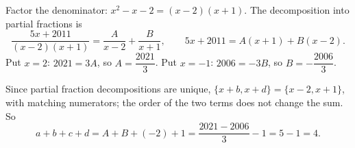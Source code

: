 Factor the denominator: $x^2-x-2=(x-2)(x+1)$. The decomposition into partial fractions is
\[
\dfrac{5x+2011}{(x-2)(x+1)}=\dfrac{A}{x-2}+\dfrac{B}{x+1},\qquad 5x+2011=A(x+1)+B(x-2).
\]
Put $x=2$: $2021=3A$, so $A=\dfrac{2021}{3}$. Put $x=-1$: $2006=-3B$, so $B=-\dfrac{2006}{3}$.

Since partial fraction decompositions are unique, $\{x+b,x+d\}=\{x-2,x+1\}$, with matching numerators; the order of the two terms does not change the sum. So
\[
a+b+c+d=A+B+(-2)+1=\dfrac{2021-2006}{3}-1=5-1=\boxed{4}.
\]
